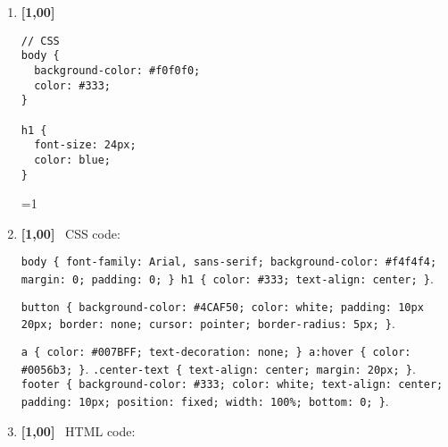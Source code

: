 \documentclass[a4paper]{article}
\newcommand{\gabarito}          {0}     %
\newcommand{\pt}                {1,00}  %
\newcommand{\ponto}[1]          {\textbf{[#1]}~}
\begin{document}
\begin{adjmulticols}{2}{0pt}{0pt}
\begin{enumerate}[resume=*questions,label={\arabic*.},leftmargin=*]
    
    
    
  \item \rtask \ponto{\pt} \lipsum[1][1-1]
  
\begin{lstlisting}[style=CSS]
// CSS 
body {
  background-color: #f0f0f0;
  color: #333;
}

h1 {
  font-size: 24px;
  color: blue;
}
\end{lstlisting}
  
  {\setlength{\columnsep}{0pt}\renewcommand{\columnseprule}{0pt}
  \begin{multicols}{2}
    \begin{answerlist}[label={\texttt{\Alph*}.},leftmargin=*]
      \ti[V.]
      \ifnum\gabarito=1\doneitem[F.]\else\ti[F.]\fi
    \end{answerlist}
  \end{multicols}
  }
    
    

  \item \rtask \ponto{\pt} \lipsum[1][1-1] CSS code:
  
    \begin{answerlist}[label={\texttt{\Alph*}.},leftmargin=*]
      \ti \lstinline[style=CSS]|body { font-family: Arial, sans-serif; background-color: #f4f4f4; margin: 0; padding: 0; } h1 { color: #333; text-align: center; }|.
      
      \di \lstinline[style=CSS]|button { background-color: #4CAF50; color: white; padding: 10px 20px; border: none; cursor: pointer; border-radius: 5px; }|.
      
      \ti \lstinline[style=CSS]|a { color: #007BFF; text-decoration: none; } a:hover { color: #0056b3; }|.
      \ti \lstinline[style=CSS]|.center-text { text-align: center; margin: 20px; }|.
      \ti \lstinline[style=CSS]|footer { background-color: #333; color: white; text-align: center; padding: 10px; position: fixed; width: 100%; bottom: 0; }|.
    \end{answerlist}


    
    
    
    
    
  \item \rtask \ponto{\pt} \lipsum[1][1-1] HTML code:
  

\end{enumerate}
\end{adjmulticols}
\end{document}
